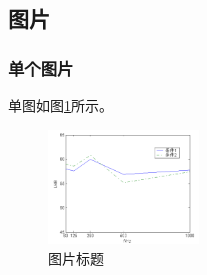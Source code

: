 \documentclass{nwputhesis}
\begin{document}
\subsection{图片}
\subsubsection{单个图片}
单图如图\ref{P1}所示。
\begin{figure}[!ht]
\centering
\includegraphics[width=4cm]{./picture/test.png}
\caption{图片标题}\label{P1}
\end{figure}
\end{document}
